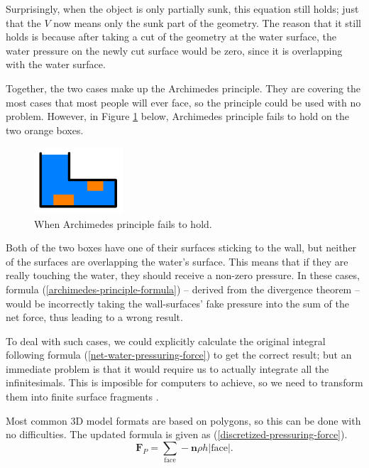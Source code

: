 Surprisingly, when the object is only partially sunk, this equation still holds;
just that the $V$ now means only the sunk part of the geometry.
The reason that it still holds is because after taking a cut of the geometry at the water surface, the water pressure on the newly cut surface would be zero, since it is overlapping with the water surface.

Together, the two cases make up the Archimedes principle.
They are covering the most cases that most people will ever face, so the principle could be used with no problem.
However, in Figure \ref{archimedes-principle-failing-case} below, Archimedes principle fails to hold on the two orange boxes.

\begin{figure}[h]
	\begin{center}
		\includegraphics[width=1.3in]{figures/ap-blind-spot.png}
	\end{center}
	\caption{When Archimedes principle fails to hold.}
	\label{archimedes-principle-failing-case}
\end{figure}

Both of the two boxes have one of their surfaces sticking to the wall, but neither of the surfaces are overlapping the water's surface.
This means that if they are really touching the water, they should receive a non-zero pressure.
In these cases, formula (\ref{archimedes-principle-formula}) -- derived from the divergence theorem -- would be incorrectly taking the wall-surfaces' fake pressure into the sum of the net force, thus leading to a wrong result.

To deal with such cases, we could explicitly calculate the original integral following formula (\ref{net-water-pressuring-force}) to get the correct result; but an immediate problem is that it would require us to actually integrate all the infinitesimals.
This is imposible for computers to achieve, so we need to transform them into finite surface fragments \cite{klosek1997integration}.

Most common 3D model formats are based on polygons, so this can be done with no difficulties.
The updated formula is given as (\ref{discretized-pressuring-force}).
\begin{equation}
	\mathbf{F}_P=\sum_{\text{face}}-\mathbf{n}\rho h|\text{face}|.
	\label{discretized-pressuring-force}
\end{equation}

